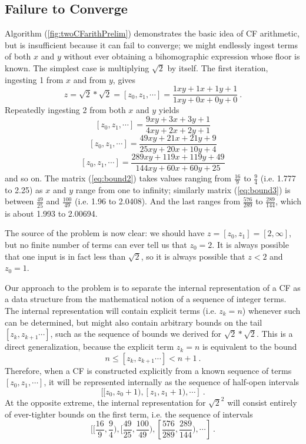 \documentclass[11pt, oneside]{amsart}   	%
\newcommand{\bihom}[8]{{\frac{#1 xy + #2 x + #3 y + #4}{#5 xy + #6 x + #7 y + #8}}}
\begin{document}
\subsection{Failure to Converge}
Algorithm (\ref{fig:twoCFarithPrelim}) demonstrates the basic idea of CF arithmetic, but is insufficient because it can fail to converge; we might endlessly ingest terms of both $x$ and $y$ without ever obtaining a bihomographic expression whose floor is known. The simplest case is multiplying $\sqrt{2}$ by itself. The first iteration, ingesting 1 from $x$ and from $y$, gives
\begin{equation}\label{eq:bound1}
z = \sqrt{2}*\sqrt{2} = [z_0,z_1, \cdots] = \bihom{1}{1}{1}{1}{1}{0}{0}{0} \ .
\end{equation}
Repeatedly ingesting 2 from both $x$ and $y$ yields
\begin{equation}\label{eq:bound2}
[z_0,z_1, \cdots]  =  \bihom{9}{3}{3}{1}{4}{2}{2}{1}
\end{equation}
\begin{equation}\label{eq:bound3}
[z_0,z_1, \cdots]  =  \bihom{49}{21}{21}{9}{25}{20}{10}{4}
\end{equation}
\begin{equation}\label{eq:bound4}
[z_0,z_1, \cdots]  =  \bihom{289}{119}{119}{49}{144}{60}{60}{25}
\end{equation}
and so on. The matrix (\ref{eq:bound2}) takes values ranging from $\frac{16}{9}$ to $\frac{9}{4}$ (i.e. 1.777 to 2.25) as $x$ and $y$ range from one to infinity;
similarly matrix (\ref{eq:bound3}) is between $\frac{49}{25}$ and $\frac{100}{49}$ (i.e. 1.96 to 2.0408). And the last ranges from $\frac{576}{289}$ to $\frac{289}{144}$, which is about 1.993 to 2.00694.

The source of the problem is now clear: we should have $z=[z_0,z_1]=[2,\infty]$, but no finite number of terms can ever tell us that $z_0=2$. It is always possible that one input is in fact less than $\sqrt{2}$, so it is always possible that $z<2$ and $z_0=1$.

Our approach to the problem is to separate the internal representation of a CF as a data structure from the mathematical notion of a  sequence of integer terms. The internal representation will contain explicit terms (i.e. $z_k=n$) whenever such can be determined, but might also contain arbitrary bounds on the tail $[z_k, z_{k+1}\cdots]$, such as the  sequence of bounds we derived for $\sqrt{2}*\sqrt{2}$. This is a direct generalization, because the explicit term  $z_k=n$ is equivalent to the bound 
\[
n \leq [z_k, z_{k+1}\cdots] < n+1 \ .
\]
Therefore, when a CF is constructed explicitly from a known sequence of terms $[z_0, z_1, \cdots]$, it will be represented internally as the sequence of half-open intervals
\[
[[z_0, z_0+1),  [z_1, z_1+1), \cdots]\ .
\] 
At the opposite extreme, the internal representation for $\sqrt{2}^2$ will consist entirely of ever-tighter bounds on the first term, i.e. the sequence of intervals
\[
[[\frac{16}{9},\frac{9}{4}), [\frac{49}{25},\frac{100}{49}), [\frac{576}{289},\frac{289}{144}), \cdots]\ .
\] 
\end{document}
